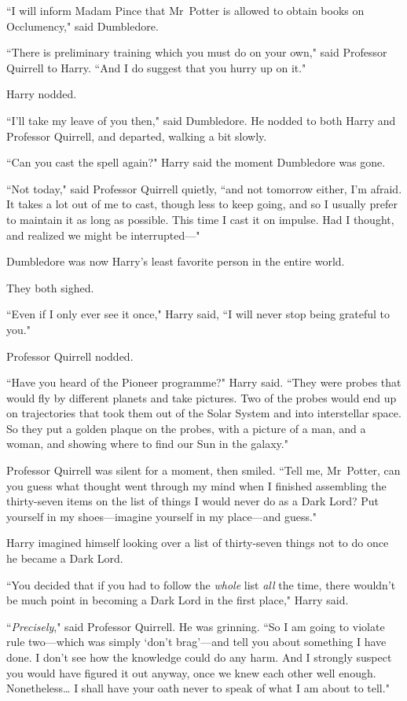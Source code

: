 ``I will inform Madam Pince that Mr~Potter is allowed to obtain books on Occlumency," said Dumbledore.

``There is preliminary training which you must do on your own," said Professor Quirrell to Harry. ``And I do suggest that you hurry up on it."

Harry nodded.

``I'll take my leave of you then," said Dumbledore. He nodded to both Harry and Professor Quirrell, and departed, walking a bit slowly.

``Can you cast the spell again?" Harry said the moment Dumbledore was gone.

``Not today," said Professor Quirrell quietly, ``and not tomorrow either, I'm afraid. It takes a lot out of me to cast, though less to keep going, and so I usually prefer to maintain it as long as possible. This time I cast it on impulse. Had I thought, and realized we might be interrupted—"

Dumbledore was now Harry's least favorite person in the entire world.

They both sighed.

``Even if I only ever see it once," Harry said, ``I will never stop being grateful to you."

Professor Quirrell nodded.

``Have you heard of the Pioneer programme?" Harry said. ``They were probes that would fly by different planets and take pictures. Two of the probes would end up on trajectories that took them out of the Solar System and into interstellar space. So they put a golden plaque on the probes, with a picture of a man, and a woman, and showing where to find our Sun in the galaxy."

Professor Quirrell was silent for a moment, then smiled. ``Tell me, Mr~Potter, can you guess what thought went through my mind when I finished assembling the thirty-seven items on the list of things I would never do as a Dark Lord? Put yourself in my shoes—imagine yourself in my place—and guess."

Harry imagined himself looking over a list of thirty-seven things not to do once he became a Dark Lord.

``You decided that if you had to follow the \emph{whole} list \emph{all} the time, there wouldn't be much point in becoming a Dark Lord in the first place," Harry said.

``\emph{Precisely}," said Professor Quirrell. He was grinning. ``So I am going to violate rule two—which was simply `don't brag'—and tell you about something I have done. I don't see how the knowledge could do any harm. And I strongly suspect you would have figured it out anyway, once we knew each other well enough. Nonetheless{\ldots} I shall have your oath never to speak of what I am about to tell."

